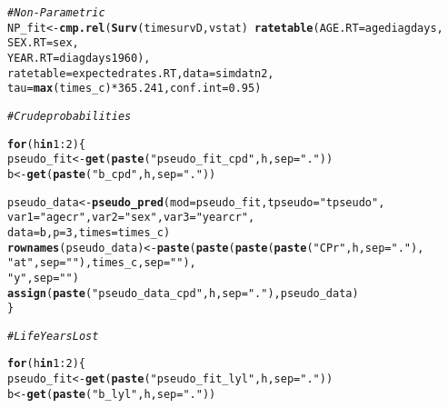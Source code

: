 \documentclass[a4paper,11pt]{article}\usepackage[]{graphicx}\usepackage[]{color}
\makeatletter
\newcommand{\hlnum}[1]{\textcolor[rgb]{0.686,0.059,0.569}{#1}}%
\newcommand{\hlstr}[1]{\textcolor[rgb]{0.192,0.494,0.8}{#1}}%
\newcommand{\hlcom}[1]{\textcolor[rgb]{0.678,0.584,0.686}{\textit{#1}}}%
\newcommand{\hlopt}[1]{\textcolor[rgb]{0,0,0}{#1}}%
\newcommand{\hlstd}[1]{\textcolor[rgb]{0.345,0.345,0.345}{#1}}%
\newcommand{\hlkwa}[1]{\textcolor[rgb]{0.161,0.373,0.58}{\textbf{#1}}}%
\newcommand{\hlkwb}[1]{\textcolor[rgb]{0.69,0.353,0.396}{#1}}%
\newcommand{\hlkwc}[1]{\textcolor[rgb]{0.333,0.667,0.333}{#1}}%
\newcommand{\hlkwd}[1]{\textcolor[rgb]{0.737,0.353,0.396}{\textbf{#1}}}%
\newenvironment{kframe}{%
 \def\at@end@of@kframe{}%
 \ifinner\ifhmode%
  \def\at@end@of@kframe{\end{minipage}}%
  \begin{minipage}{\columnwidth}%
 \fi\fi%
 \def\FrameCommand##1{\hskip\@totalleftmargin \hskip-\fboxsep
 \colorbox{shadecolor}{##1}\hskip-\fboxsep
     \hskip-\linewidth \hskip-\@totalleftmargin \hskip\columnwidth}%
 \MakeFramed {\advance\hsize-\width
   \@totalleftmargin\z@ \linewidth\hsize
   \@setminipage}}%
 {\par\unskip\endMakeFramed%
 \at@end@of@kframe}
\newenvironment{knitrout}{}{} %
\makeatother
\begin{document}
\begin{knitrout}
\color{fgcolor}\begin{kframe}
\begin{alltt}
\hlcom{# N o n - P a r a m e t r i c}
  \hlstd{NP_fit} \hlkwb{<-} \hlkwd{cmp.rel}\hlstd{(}\hlkwd{Surv}\hlstd{(timesurvD,vstat)}\hlopt{~}\hlkwd{ratetable}\hlstd{(}\hlkwc{AGE.RT}\hlstd{=agediagdays,}
                                                    \hlkwc{SEX.RT}\hlstd{=sex,}
                                                    \hlkwc{YEAR.RT}\hlstd{=diagdays1960),}
                    \hlkwc{ratetable}\hlstd{=expectedrates.RT,}\hlkwc{data}\hlstd{=simdatn2,}
                    \hlkwc{tau}\hlstd{=}\hlkwd{max}\hlstd{(times_c)}\hlopt{*}\hlnum{365.241}\hlstd{,}\hlkwc{conf.int}\hlstd{=}\hlnum{0.95}\hlstd{)}


\hlcom{# C r u d e  p r o b a b i l i t i e s }

    \hlkwa{for} \hlstd{(h} \hlkwa{in} \hlnum{1}\hlopt{:}\hlnum{2}\hlstd{)\{}
        \hlstd{pseudo_fit} \hlkwb{<-} \hlkwd{get}\hlstd{(}\hlkwd{paste}\hlstd{(}\hlstr{"pseudo_fit_cpd"}\hlstd{,h,}\hlkwc{sep}\hlstd{=}\hlstr{"."}\hlstd{))}
        \hlstd{b} \hlkwb{<-} \hlkwd{get}\hlstd{(}\hlkwd{paste}\hlstd{(}\hlstr{"b_cpd"}\hlstd{,h,}\hlkwc{sep}\hlstd{=}\hlstr{"."}\hlstd{))}

        \hlstd{pseudo_data}\hlkwb{<-}\hlkwd{pseudo_pred}\hlstd{(}\hlkwc{mod}\hlstd{=pseudo_fit,} \hlkwc{tpseudo}\hlstd{=}\hlstr{"tpseudo"}\hlstd{,}
                             \hlkwc{var1}\hlstd{=}\hlstr{"agecr"}\hlstd{,} \hlkwc{var2}\hlstd{=}\hlstr{"sex"}\hlstd{,} \hlkwc{var3}\hlstd{=}\hlstr{"yearcr"}\hlstd{,}
                             \hlkwc{data}\hlstd{=b,}\hlkwc{p}\hlstd{=}\hlnum{3}\hlstd{,} \hlkwc{times}\hlstd{=times_c)}
        \hlkwd{rownames}\hlstd{(pseudo_data)}\hlkwb{<-} \hlkwd{paste}\hlstd{(}\hlkwd{paste}\hlstd{(}\hlkwd{paste}\hlstd{(}\hlkwd{paste}\hlstd{(}\hlstr{"CPr"}\hlstd{,h,}\hlkwc{sep}\hlstd{=}\hlstr{"."}\hlstd{),}
                                      \hlstr{"at"}\hlstd{,}\hlkwc{sep}\hlstd{=}\hlstr{" "}\hlstd{), times_c,} \hlkwc{sep}\hlstd{=}\hlstr{" "}\hlstd{),}
                                      \hlstr{"y"}\hlstd{,}\hlkwc{sep}\hlstd{=}\hlstr{""}\hlstd{)}
        \hlkwd{assign}\hlstd{(}\hlkwd{paste}\hlstd{(}\hlstr{"pseudo_data_cpd"}\hlstd{, h,} \hlkwc{sep}\hlstd{=}\hlstr{"."}\hlstd{),pseudo_data)}
    \hlstd{\}}


\hlcom{# L i f e  Y e a r s  L o s t}

    \hlkwa{for} \hlstd{(h} \hlkwa{in} \hlnum{1}\hlopt{:}\hlnum{2}\hlstd{)\{}
        \hlstd{pseudo_fit} \hlkwb{<-} \hlkwd{get}\hlstd{(}\hlkwd{paste}\hlstd{(}\hlstr{"pseudo_fit_lyl"}\hlstd{,h,}\hlkwc{sep}\hlstd{=}\hlstr{"."}\hlstd{))}
        \hlstd{b} \hlkwb{<-} \hlkwd{get}\hlstd{(}\hlkwd{paste}\hlstd{(}\hlstr{"b_lyl"}\hlstd{,h,}\hlkwc{sep}\hlstd{=}\hlstr{"."}\hlstd{))}


\end{alltt}
\end{kframe}
\end{knitrout}
\end{document}
